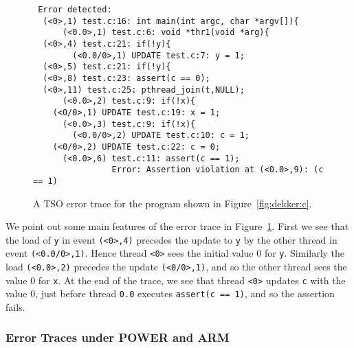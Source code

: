 \documentclass[a4paper]{article}
\begin{document}
\begin{figure}
\begin{verbatim}
 Error detected:
  (<0>,1) test.c:16: int main(int argc, char *argv[]){
      (<0.0>,1) test.c:6: void *thr1(void *arg){
  (<0>,4) test.c:21: if(!y){
        (<0.0/0>,1) UPDATE test.c:7: y = 1;
  (<0>,5) test.c:21: if(!y){
  (<0>,8) test.c:23: assert(c == 0);
  (<0>,11) test.c:25: pthread_join(t,NULL);
      (<0.0>,2) test.c:9: if(!x){
    (<0/0>,1) UPDATE test.c:19: x = 1;
      (<0.0>,3) test.c:9: if(!x){
        (<0.0/0>,2) UPDATE test.c:10: c = 1;
    (<0/0>,2) UPDATE test.c:22: c = 0;
      (<0.0>,6) test.c:11: assert(c == 1);
                Error: Assertion violation at (<0.0>,9): (c == 1)
\end{verbatim}
  \caption{A TSO error trace for the program shown in
    Figure~\ref{fig:dekker:c}.}\label{fig:ex:error:trace:dekker:tso}
\end{figure}

We point out some main features of the error trace in
Figure~\ref{fig:ex:error:trace:dekker:tso}.
%
First we see that the load of \texttt{y} in event \texttt{(<0>,4)}
precedes the update to \texttt{y} by the other thread in event
\texttt{(<0.0/0>,1)}. Hence thread \texttt{<0>} sees the initial value
0 for \texttt{y}. Similarly the load \texttt{(<0.0>,2)} precedes the
update \texttt{(<0/0>,1)}, and so the other thread sees the value 0
for \texttt{x}.
%
At the end of the trace, we see that thread \texttt{<0>} updates
\texttt{c} with the value 0, just before thread \texttt{0.0} executes
\texttt{assert(c == 1)}, and so the assertion fails.

\subsubsection{Error Traces under POWER and ARM}
\end{document}
